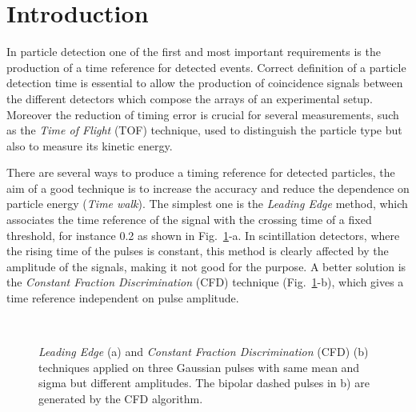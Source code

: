 \section*{Introduction}
In particle detection one of the first and most important requirements is the production of a time reference for detected events. Correct definition of a particle detection time  is essential to allow the production of coincidence signals between the different detectors which compose the arrays of an experimental setup. Moreover the reduction of timing error  is crucial for several measurements, such as the \textit{Time of Flight} (TOF) technique, used to distinguish the particle type but also to measure its kinetic energy.

There are several ways to produce a timing reference for detected particles, the aim of a good technique is to increase the accuracy and reduce the dependence on particle energy (\textit{Time walk}).
The simplest one is the \textit{Leading Edge} method, which associates the time reference of the signal with the crossing time of a fixed threshold, for instance 0.2 as shown in Fig.~\ref{fig:LE-CFD}-a. In scintillation detectors, where the rising time of the pulses is constant, this method is clearly affected by the amplitude of the signals, making it not good for the purpose. 
A better solution is the \textit{Constant Fraction Discrimination} (CFD) technique (Fig.~\ref{fig:LE-CFD}-b), which gives a time reference independent on pulse amplitude.
\begin{figure}[h!]
	\centering
	 \quad
	 \\
	\caption{\textit{Leading Edge} (a) and \textit{Constant Fraction Discrimination} (CFD) (b) techniques applied on three Gaussian pulses with same mean and sigma but different amplitudes. The bipolar dashed pulses in b) are generated by the CFD algorithm.}
	\label{fig:LE-CFD}
\end{figure}


